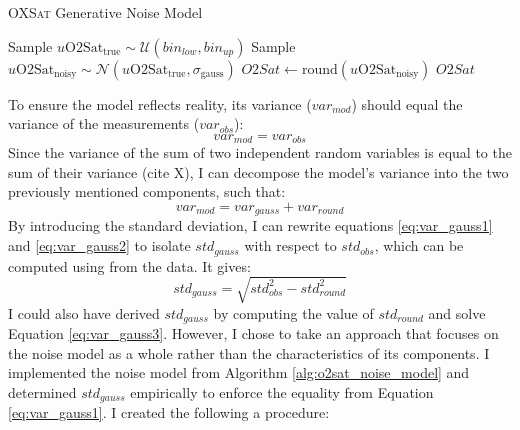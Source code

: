 \begin{algorithm}
    \caption{\textsc{OXSat} Generative Noise Model}\label{alg:o2sat_noise_model}
    \begin{algorithmic}[1]
        \State Sample $u\mathrm{O2Sat}_{\mathrm{true}} \sim \mathcal{U}(\mathit{bin_{low}}, \mathit{bin_{up}})$
        \State Sample $u\mathrm{O2Sat}_{\mathrm{noisy}} \sim \mathcal{N}(u\mathrm{O2Sat}_{\mathrm{true}}, \sigma_{\mathrm{gauss}})$
        \State $O2Sat \gets \mathrm{round}(u\mathrm{O2Sat}_{\mathrm{noisy}})$
        \State \Return $O2Sat$
    \EndFunction
    \end{algorithmic}
\end{algorithm}

To ensure the model reflects reality, its variance ($var_{mod}$) should equal the variance of the \OXSat measurements ($var_{obs}$):
\begin{equation} \label{eq:var_gauss1}
    var_{mod} = var_{obs}
\end{equation}
Since the variance of the sum of two independent random variables is equal to the sum of their variance (cite X), I can decompose the model's variance into the two previously mentioned components, such that:
\begin{equation} \label{eq:var_gauss2}
    var_{mod} = var_{gauss} + var_{round}
\end{equation}
By introducing the standard deviation, I can rewrite equations \ref{eq:var_gauss1} and \ref{eq:var_gauss2} to isolate $std_{gauss}$ with respect to $std_{obs}$, which can be computed using from the data. It gives:
\begin{equation} \label{eq:var_gauss3}
    std_{gauss} = \sqrt{std_{obs}^2 - std_{round}^2}
\end{equation}
I could also have derived $std_{gauss}$ by computing the value of $std_{round}$ and solve Equation \ref{eq:var_gauss3}. However, I chose to take an approach that focuses on the noise model as a whole rather than the characteristics of its components. I implemented the noise model from Algorithm \ref{alg:o2sat_noise_model} and determined $std_{gauss}$ empirically to enforce the equality from Equation \ref{eq:var_gauss1}. I created the following a procedure:
